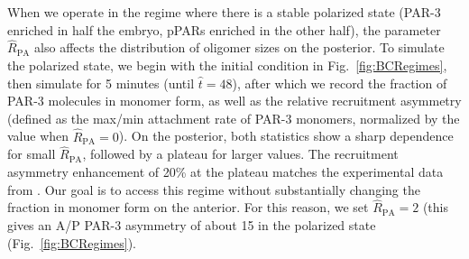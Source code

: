 \documentclass[11pt]{article}
\newcommand{\6}[1]{#1_{\text{6}}}
\newcommand{\3}[1]{#1_{\text{3}}}
\begin{document}
When we operate in the regime where there is a stable polarized state (PAR-3 enriched in half the embryo, pPARs enriched in the other half), the parameter $\hat R_\text{PA}$ also affects the distribution of oligomer sizes on the posterior. To simulate the polarized state, we begin with the initial condition in Fig.\ \ref{fig:BCRegimes}, then simulate for 5 minutes (until $\hat t = 48$), after which we record the fraction of PAR-3 molecules in monomer form, as well as the relative recruitment asymmetry (defined as the max/min attachment rate of PAR-3 monomers, normalized by the value when $\hat R_\text{PA}=0$). On the posterior, both statistics show a sharp dependence for small $\hat R_\text{PA}$, followed by a plateau for larger values. The recruitment asymmetry enhancement of 20\% at the plateau matches the experimental data from \cite[Fig.~5]{lang2023oligomerization}. Our goal is to access this regime without substantially changing the fraction in monomer form on the anterior. For this reason, we set $\hat R_\text{PA}=2$ (this gives an A/P PAR-3 asymmetry of about 15 in the polarized state (Fig.\ \ref{fig:BCRegimes}).

\newpage
\end{document}
